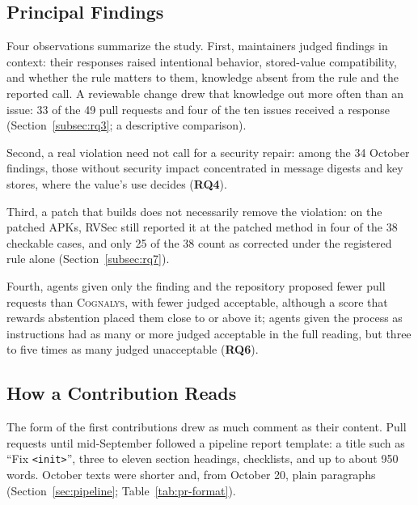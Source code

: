 \documentclass[conference]{IEEEtran}
\newcommand{\system}{\textsc{Cognalys}}
\newcommand{\researchq}[1]{\textbf{RQ#1}}
\begin{document}
\subsection{Principal Findings}

Four observations summarize the study. First, maintainers judged findings in
context: their responses raised intentional behavior, stored-value
compatibility, and whether the rule matters to them, knowledge absent from the
rule and the reported call. A reviewable change drew that knowledge out more
often than an issue: 33 of the 49 pull requests and four of the ten issues
received a response (Section~\ref{subsec:rq3}; a descriptive comparison).

Second, a real violation need not call for a security repair: among the 34
October findings, those without security impact concentrated in message
digests and key stores, where the value's use decides (\researchq{4}).

Third, a patch that builds does not necessarily remove the violation: on the
patched APKs, RVSec still reported it at the patched method in four of the 38
checkable cases, and only 25 of the 38 count as corrected under the registered
rule alone (Section~\ref{subsec:rq7}).

Fourth, agents given only the finding and the repository proposed fewer pull
requests than \system{}, with fewer judged acceptable, although a score that
rewards abstention placed them close to or above it; agents given the process
as instructions had as many or more judged acceptable in the full reading, but
three to five times as many judged unacceptable (\researchq{6}).

\subsection{How a Contribution Reads}
\label{subsec:form}

The form of the first contributions drew as much comment as their content. Pull
requests until mid-September followed a pipeline report template: a title such
as ``Fix \texttt{<init>}'', three to eleven section headings, checklists, and up
to about 950 words. October texts were shorter and, from October 20, plain
paragraphs (Section~\ref{sec:pipeline}; Table~\ref{tab:pr-format}).
\end{document}
